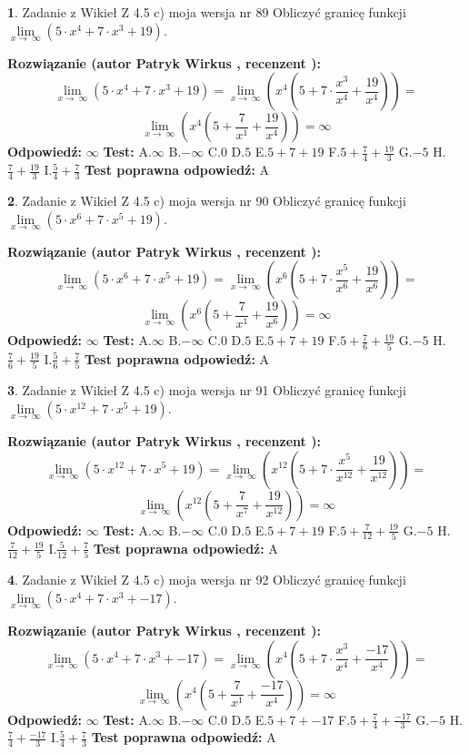 \documentclass[12pt, a4paper]{article}
\theoremstyle{definition} %
\newtheorem{zad}{}
\newcommand{\zadStart}[1]{\begin{zad}#1\newline}
\newcommand{\zadStop}{\end{zad}}
\newcommand{\rozwStart}[2]{\noindent \textbf{Rozwiązanie (autor #1 , recenzent #2): }\newline}
\newcommand{\rozwStop}{\newline}
\newcommand{\odpStart}{\noindent \textbf{Odpowiedź:}\newline}
\newcommand{\odpStop}{\newline}
\newcommand{\testStart}{\noindent \textbf{Test:}\newline}
\newcommand{\testStop}{\newline}
\newcommand{\kluczStart}{\noindent \textbf{Test poprawna odpowiedź:}\newline}
\newcommand{\kluczStop}{\newline}
\begin{document}
\zadStart{Zadanie z Wikieł Z 4.5 c) moja wersja nr 89}
Obliczyć granicę funkcji  $\lim\limits_{x\to\ \infty}(5 \cdot x^{4}+7 \cdot x^{3}+19)$.
\zadStop
\rozwStart{Patryk Wirkus}{}
$$\lim\limits_{x\to\ \infty}(5 \cdot x^{4}+7 \cdot x^{3}+19) = \lim\limits_{x\to\ \infty}(x^{4}(5 +7 \cdot \frac{x^{3}}{x^{4}}+\frac{19}{x^{4}})) =$$ $$\lim\limits_{x\to\ \infty}(x^{4}(5 +\frac{7}{x^{1}}+\frac{19}{x^{4}})) =\infty$$
\rozwStop
\odpStart
$\infty$
\odpStop
\testStart
A.$\infty$ B.$-\infty$ C.$0$ D.$5$ E.$5 + 7 + 19$
F.$5+\frac{7}{4}+\frac{19}{3}$ G.$-5$
H.$\frac{7}{4}+\frac{19}{3}$
I.$\frac{5}{4}+\frac{7}{3}$
\testStop
\kluczStart
A
\kluczStop



\zadStart{Zadanie z Wikieł Z 4.5 c) moja wersja nr 90}
Obliczyć granicę funkcji  $\lim\limits_{x\to\ \infty}(5 \cdot x^{6}+7 \cdot x^{5}+19)$.
\zadStop
\rozwStart{Patryk Wirkus}{}
$$\lim\limits_{x\to\ \infty}(5 \cdot x^{6}+7 \cdot x^{5}+19) = \lim\limits_{x\to\ \infty}(x^{6}(5 +7 \cdot \frac{x^{5}}{x^{6}}+\frac{19}{x^{6}})) =$$ $$\lim\limits_{x\to\ \infty}(x^{6}(5 +\frac{7}{x^{1}}+\frac{19}{x^{6}})) =\infty$$
\rozwStop
\odpStart
$\infty$
\odpStop
\testStart
A.$\infty$ B.$-\infty$ C.$0$ D.$5$ E.$5 + 7 + 19$
F.$5+\frac{7}{6}+\frac{19}{5}$ G.$-5$
H.$\frac{7}{6}+\frac{19}{5}$
I.$\frac{5}{6}+\frac{7}{5}$
\testStop
\kluczStart
A
\kluczStop



\zadStart{Zadanie z Wikieł Z 4.5 c) moja wersja nr 91}
Obliczyć granicę funkcji  $\lim\limits_{x\to\ \infty}(5 \cdot x^{12}+7 \cdot x^{5}+19)$.
\zadStop
\rozwStart{Patryk Wirkus}{}
$$\lim\limits_{x\to\ \infty}(5 \cdot x^{12}+7 \cdot x^{5}+19) = \lim\limits_{x\to\ \infty}(x^{12}(5 +7 \cdot \frac{x^{5}}{x^{12}}+\frac{19}{x^{12}})) =$$ $$\lim\limits_{x\to\ \infty}(x^{12}(5 +\frac{7}{x^{7}}+\frac{19}{x^{12}})) =\infty$$
\rozwStop
\odpStart
$\infty$
\odpStop
\testStart
A.$\infty$ B.$-\infty$ C.$0$ D.$5$ E.$5 + 7 + 19$
F.$5+\frac{7}{12}+\frac{19}{5}$ G.$-5$
H.$\frac{7}{12}+\frac{19}{5}$
I.$\frac{5}{12}+\frac{7}{5}$
\testStop
\kluczStart
A
\kluczStop



\zadStart{Zadanie z Wikieł Z 4.5 c) moja wersja nr 92}
Obliczyć granicę funkcji  $\lim\limits_{x\to\ \infty}(5 \cdot x^{4}+7 \cdot x^{3}+-17)$.
\zadStop
\rozwStart{Patryk Wirkus}{}
$$\lim\limits_{x\to\ \infty}(5 \cdot x^{4}+7 \cdot x^{3}+-17) = \lim\limits_{x\to\ \infty}(x^{4}(5 +7 \cdot \frac{x^{3}}{x^{4}}+\frac{-17}{x^{4}})) =$$ $$\lim\limits_{x\to\ \infty}(x^{4}(5 +\frac{7}{x^{1}}+\frac{-17}{x^{4}})) =\infty$$
\rozwStop
\odpStart
$\infty$
\odpStop
\testStart
A.$\infty$ B.$-\infty$ C.$0$ D.$5$ E.$5 + 7 + -17$
F.$5+\frac{7}{4}+\frac{-17}{3}$ G.$-5$
H.$\frac{7}{4}+\frac{-17}{3}$
I.$\frac{5}{4}+\frac{7}{3}$
\testStop
\kluczStart
A
\kluczStop
\end{document}
